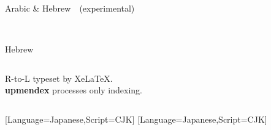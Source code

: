 \documentclass[aspectratio=169,10pt]{beamer}
\begin{document}
\begin{frame}[fragile]{Arabic \& Hebrew~~{\scriptsize (experimental)}}
\begin{columns}
\begin{column}{79mm}
\begin{columns}
\begin{column}{39mm}
\begin{center}
\\[2mm]%
Hebrew
\end{center}
\end{column}
\end{columns}
\vspace{2mm}
\begin{center}
{\normalsize R-to-L typeset by XeLaTeX.\\
\textbf{upmendex} processes only indexing.}
\end{center}
\end{column}
\end{columns}

\end{frame}


\setmainfont{Noto Serif CJK JP}[Language=Japanese,Script=CJK]
\setsansfont{Noto Sans CJK JP}[Language=Japanese,Script=CJK]
\setmonofont{Noto Sans Mono CJK JP}
\end{document}
